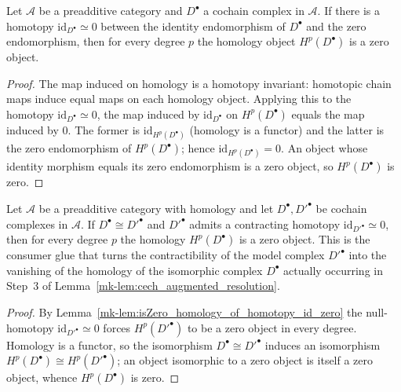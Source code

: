 \begin{lemma}\label{mk-lem:isZero_homology_of_homotopy_id_zero}
  \leanok

  Let \(\mathcal{A}\) be a preadditive category and \(D^\bullet\) a cochain complex in
  \(\mathcal{A}\). If there is a homotopy \(\mathrm{id}_{D^\bullet} \simeq 0\) between the
  identity endomorphism of \(D^\bullet\) and the zero endomorphism, then for every degree
  \(p\) the homology object \(H^p(D^\bullet)\) is a zero object.
\end{lemma}
\begin{proof}
  \leanok

The map induced on homology is a homotopy invariant: homotopic chain maps induce equal
  maps on each homology object. Applying this to the homotopy \(\mathrm{id}_{D^\bullet}
  \simeq 0\), the map induced by \(\mathrm{id}_{D^\bullet}\) on \(H^p(D^\bullet)\) equals the
  map induced by \(0\). The former is \(\mathrm{id}_{H^p(D^\bullet)}\) (homology is a
  functor) and the latter is the zero endomorphism of \(H^p(D^\bullet)\); hence
  \(\mathrm{id}_{H^p(D^\bullet)} = 0\). An object whose identity morphism equals its zero
  endomorphism is a zero object, so \(H^p(D^\bullet)\) is zero.
\end{proof}

\begin{lemma}\label{mk-lem:isZero_homology_of_iso_homotopy_id_zero}
  \leanok

  Let \(\mathcal{A}\) be a preadditive category with homology and let \(D^\bullet, D'^\bullet\) be
  cochain complexes in \(\mathcal{A}\). If \(D^\bullet \cong D'^\bullet\) and \(D'^\bullet\) admits
  a contracting homotopy \(\mathrm{id}_{D'^\bullet} \simeq 0\), then for every degree \(p\) the
  homology \(H^p(D^\bullet)\) is a zero object. This is the consumer glue that turns the
  contractibility of the model complex \(D'^\bullet\) into the vanishing of the homology of the
  isomorphic complex \(D^\bullet\) actually occurring in Step~3 of
  Lemma~\ref{mk-lem:cech_augmented_resolution}.
\end{lemma}
\begin{proof}
  \leanok
  By Lemma~\ref{mk-lem:isZero_homology_of_homotopy_id_zero} the null-homotopy \(\mathrm{id}_{D'^\bullet}
  \simeq 0\) forces \(H^p(D'^\bullet)\) to be a zero object in every degree. Homology is a functor,
  so the isomorphism \(D^\bullet \cong D'^\bullet\) induces an isomorphism \(H^p(D^\bullet) \cong
  H^p(D'^\bullet)\); an object isomorphic to a zero object is itself a zero object, whence
  \(H^p(D^\bullet)\) is zero.
\end{proof}

